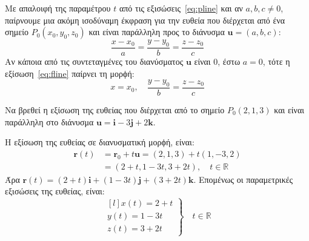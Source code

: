 \begin{rem}
  Με απαλοιφή της παραμέτρου $t$ από τις εξισώσεις~\eqref{eq:pline} και αν 
  $ a, b, c \neq 0 $, παίρνουμε μια ακόμη ισοδύναμη έκφραση για την ευθεία που 
  διέρχεται από ένα σημείο $ P_{0}(x_{0}, y_{0}, z_{0}) $ και είναι παράλληλη προς το 
  διάνυσμα $ \mathbf{u} = (a,b,c) $:
  \begin{equation}\label{eq:fline}
    \boxed{\frac{x- x_{0}}{a} = \frac{y- y_{0}}{b} = \frac{z- z_{0}}{c}}
  \end{equation}
  Αν κάποια από τις συντεταγμένες του διανύσματος $ \mathbf{u} $ είναι 0, έστω $ a=0 $,
  τότε η εξίσωση~\eqref{eq:fline} παίρνει τη μορϕή:
  \[
    x = x_{0}, \quad \frac{y- y_{0}}{b} = \frac{z- z_{0}}{c}
  \]
\end{rem}


\begin{example}
  Να βρεθεί η εξίσωση της ευθείας που διέρχεται από το σημείο $ P_{0}(2,1,3) $ 
  και είναι παράλληλη στο διάνυσμα 
  $ \mathbf{u} = \mathbf{i}- 3 \mathbf{j}+2 \mathbf{k} $.
\end{example}
\begin{solution}
  Η εξίσωση της ευθείας σε διανυσματική μορϕή, είναι:
  \begin{align*}
    \mathbf{r}(t) &= \mathbf{r}_{0} + t \mathbf{u} = (2,1,3) + t(1,-3,2) \\
                  &= (2+t,1-3t,3+2t), \quad t \in \mathbb{R}
  \end{align*} 
  Άρα $ \mathbf{r}(t) = (2+t) \mathbf{i} + (1-3t) \mathbf{j} + (3+2t) \mathbf{k} $. 
  Επομένως οι παραμετρικές εξισώσεις της ευθείας, είναι:
  \[
    \left.
      \begin{matrix*}[l]
        x(t) = 2+t \\
        y(t) = 1-3t \\
        z(t) = 3+2t
      \end{matrix*} 
    \right\} \quad  t \in \mathbb{R} 
  \]
\end{solution}

